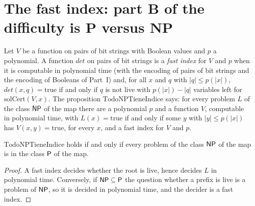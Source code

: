 \section{The fast index: part B of the difficulty is P versus NP}
\label{sec:search-fast-index}

\begin{definition}
  \label{def:search-indice-rapido}
  \leanok
  Let $V$ be a function on pairs of bit strings with Boolean values and $p$ a polynomial. A function
  $\mathit{det}$ on pairs of bit strings is a \emph{fast index} for $V$ and $p$ when it is
  computable in polynomial time (with the encoding of pairs of bit strings and the encoding of
  Booleans of Part~I) and, for all $x$ and $q$ with $|q| \le p(|x|)$, $\mathit{det}(x, q) =
  \mathrm{true}$ if and only if $q$ is not live with $p(|x|) - |q|$ variables left for
  $\mathrm{solCert}(V, x)$. The proposition $\mathrm{TodoNPTieneIndice}$ says: for every problem
  $L$ of the class $\mathsf{NP}$ of the map there are a polynomial $p$ and a function $V$, computable in
  polynomial time, with $L(x) = \mathrm{true}$ if and only if some $y$ with $|y| \le p(|x|)$ has
  $V(x, y) = \mathrm{true}$, for every $x$, and a fast index for $V$ and $p$.
  \own{}
\end{definition}

\begin{theorem}
  \label{thm:search-indice-iff}
  \leanok
  $\mathrm{TodoNPTieneIndice}$ holds if and only if every problem of the class $\mathsf{NP}$ of the map is
  in the class $\mathsf{P}$ of the map.
  \own{}
\end{theorem}

\begin{proof}
  \leanok
  A fast index decides whether the root is live, hence decides $L$ in polynomial time. Conversely,
  if $\mathsf{NP} \subseteq \mathsf{P}$ the question whether a prefix is live is a problem of $\mathsf{NP}$, so it is
  decided in polynomial time, and the decider is a fast index.
\end{proof}

